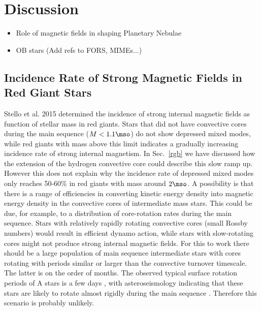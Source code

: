\section{Discussion}
\begin{itemize}
\item Role of magnetic fields in shaping Planetary Nebulae
\item OB stars (Add refs to FORS, MIMEs...)
\end{itemize}

\subsection{Incidence Rate of Strong Magnetic Fields in Red Giant Stars}
Stello et al. 2015 determined the incidence of strong internal magnetic fields as function of stellar mass in red giants. Stars that did not have convective cores during the main sequence ($M<1.1\mso$) do not show depressed mixed modes, while red giants with mass above this limit indicates a gradually increasing incidence rate of strong internal magnetism.    In Sec.~\ref{rgb} we have discussed how the extension of the hydrogen convective core could describe this slow ramp up. However this does not explain why the incidence rate of depressed mixed modes only reaches 50-60\% in red giants with mass around $2\mso$.
A possibility is that there is a range of efficiencies in converting kinetic energy density into magnetic energy density in the convective cores of intermediate mass stars. This could be due, for example, to a distribution of core-rotation rates during the main sequence. Stars with relatively rapidly rotating convective cores (small Rossby numbers) would result in efficient dynamo action, while stars with slow-rotating cores might not produce strong internal magnetic fields. For this to work there should be a large population of main sequence intermediate stars with cores rotating with periods similar or larger than the convective turnover timescale. The latter is on the order of months. The  observed typical surface rotation periods of A stars is a few days \citep{Zorec_2012}, with  asteroseismology indicating that these stars are likely to rotate almost rigidly during the main sequence \citep[e.g.][]{Benomar_2015}. Therefore this scenario is probably unlikely.

